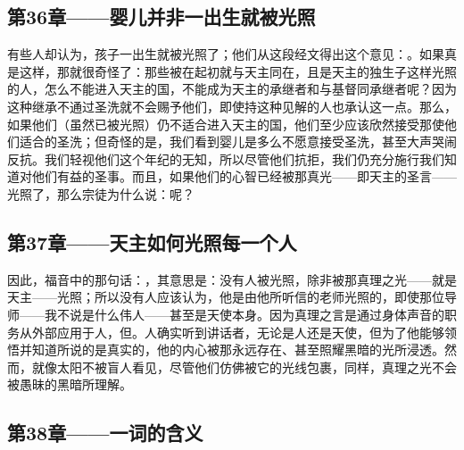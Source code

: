 
\subsection{第36章——婴儿并非一出生就被光照}

有些人却认为，孩子一出生就被光照了；他们从这段经文得出这个意见：。如果真是这样，那就很奇怪了：那些被在起初就与天主同在，且是天主的独生子这样光照的人，怎么不能进入天主的国，不能成为天主的承继者和与基督同承继者呢？因为这种继承不通过圣洗就不会赐予他们，即使持这种见解的人也承认这一点。那么，如果他们（虽然已被光照）仍不适合进入天主的国，他们至少应该欣然接受那使他们适合的圣洗；但奇怪的是，我们看到婴儿是多么不愿意接受圣洗，甚至大声哭闹反抗。我们轻视他们这个年纪的无知，所以尽管他们抗拒，我们仍充分施行我们知道对他们有益的圣事。而且，如果他们的心智已经被那真光——即天主的圣言——光照了，那么宗徒为什么说：呢？\par


\subsection{第37章——天主如何光照每一个人}

因此，福音中的那句话：，其意思是：没有人被光照，除非被那真理之光——就是天主——光照；所以没有人应该认为，他是由他所听信的老师光照的，即使那位导师——我不说是什么伟人——甚至是天使本身。因为真理之言是通过身体声音的职务从外部应用于人，但。人确实听到讲话者，无论是人还是天使，但为了他能够领悟并知道所说的是真实的，他的内心被那永远存在、甚至照耀黑暗的光所浸透。然而，就像太阳不被盲人看见，尽管他们仿佛被它的光线包裹，同样，真理之光不会被愚昧的黑暗所理解。\par


\subsection{第38章——一词的含义}

